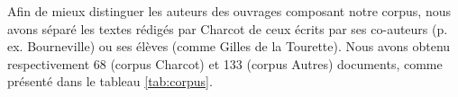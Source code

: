 
Afin de mieux distinguer les auteurs des ouvrages composant notre corpus, nous avons séparé les textes rédigés par Charcot de ceux écrits par ses co-auteurs (p. ex. Bourneville) ou ses élèves (comme Gilles de la Tourette). Nous avons obtenu respectivement 68 (corpus \og{}Charcot\fg{}) et 133 (corpus \og{}Autres\fg{}) documents, comme présenté dans le tableau \ref{tab:corpus}.


\begin{table}[h]
	\small
	\centering
	\caption{Description de notre corpus d'étude.}
	\label{tab:corpus}
\end{table}

